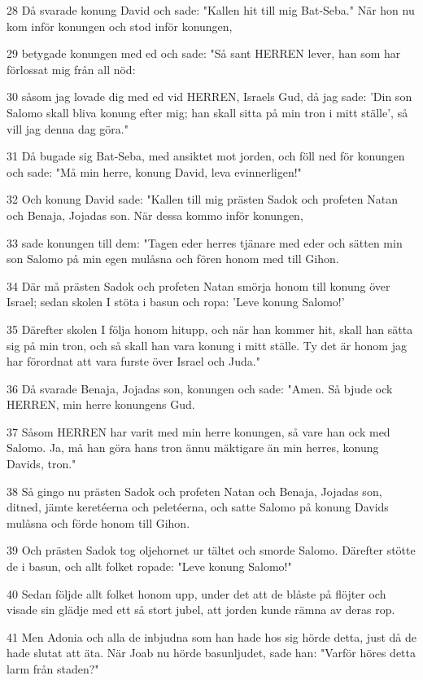 \par 28 Då svarade konung David och sade: "Kallen hit till mig Bat-Seba." När hon nu kom inför konungen och stod inför konungen,
\par 29 betygade konungen med ed och sade: "Så sant HERREN lever, han som har förlossat mig från all nöd:
\par 30 såsom jag lovade dig med ed vid HERREN, Israels Gud, då jag sade: 'Din son Salomo skall bliva konung efter mig; han skall sitta på min tron i mitt ställe', så vill jag denna dag göra."
\par 31 Då bugade sig Bat-Seba, med ansiktet mot jorden, och föll ned för konungen och sade: "Må min herre, konung David, leva evinnerligen!"
\par 32 Och konung David sade: "Kallen till mig prästen Sadok och profeten Natan och Benaja, Jojadas son. När dessa kommo inför konungen,
\par 33 sade konungen till dem: "Tagen eder herres tjänare med eder och sätten min son Salomo på min egen mulåsna och fören honom med till Gihon.
\par 34 Där må prästen Sadok och profeten Natan smörja honom till konung över Israel; sedan skolen I stöta i basun och ropa: 'Leve konung Salomo!'
\par 35 Därefter skolen I följa honom hitupp, och när han kommer hit, skall han sätta sig på min tron, och så skall han vara konung i mitt ställe. Ty det är honom jag har förordnat att vara furste över Israel och Juda."
\par 36 Då svarade Benaja, Jojadas son, konungen och sade: "Amen. Så bjude ock HERREN, min herre konungens Gud.
\par 37 Såsom HERREN har varit med min herre konungen, så vare han ock med Salomo. Ja, må han göra hans tron ännu mäktigare än min herres, konung Davids, tron."
\par 38 Så gingo nu prästen Sadok och profeten Natan och Benaja, Jojadas son, ditned, jämte keretéerna och peletéerna, och satte Salomo på konung Davids mulåsna och förde honom till Gihon.
\par 39 Och prästen Sadok tog oljehornet ur tältet och smorde Salomo. Därefter stötte de i basun, och allt folket ropade: "Leve konung Salomo!"
\par 40 Sedan följde allt folket honom upp, under det att de blåste på flöjter och visade sin glädje med ett så stort jubel, att jorden kunde rämna av deras rop.
\par 41 Men Adonia och alla de inbjudna som han hade hos sig hörde detta, just då de hade slutat att äta. När Joab nu hörde basunljudet, sade han: "Varför höres detta larm från staden?"
